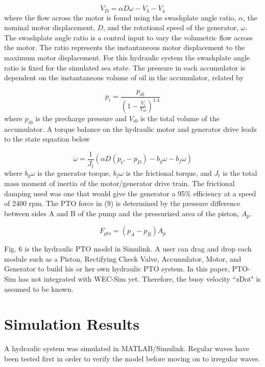 \documentclass[conference]{IEEEtran}
\begin{document}
\begin{equation}
\dot{V}_D=\alpha D \omega-\dot{V}_3-\dot{V}_4 
\end{equation}
%
where the flow across the motor is found using the swashplate angle ratio, $\alpha$, the nominal motor displacement, $D$, and the rotational speed of the generator, $\omega$. The swashplate angle ratio is a control input to vary the volumetric flow across the motor. The ratio represents the instantaneous motor displacement to the maximum motor displacement. For this hydraulic system the swashplate angle ratio is fixed for the simulated sea state. The pressure in each accumulator is dependent on the instantaneous volume of oil in the accumulator, related by

\begin{equation}
p_i=\frac{p_{i0}}{(1-\frac{V_i}{V_{i0}})^{1.4}}
\end{equation}
%
where $p_{i0}$ is the precharge pressure and $V_{i0}$ is the total volume of the accumulator. A torque balance on the hydraulic motor and generator drive leads to the state equation below

\begin{equation}
\dot{\omega}=\frac{1}{J_t}(\alpha D (p_C-p_D)-b_g \omega-b_f \omega)
\end{equation}
%
where $b_g$$\omega$ is the generator torque, $b_f$$\omega$ is the frictional torque, and $J_t$ is the total mass moment of inertia of the motor/generator drive train.  The frictional damping used was one that would give the generator a 95\% efficiency at a speed of 2400 rpm. 
The PTO force in (9) is determined by the pressure difference between sides A and B of the pump and the pressurized area of the piston, $A_p$.

\begin{equation}
F_{pto}=(p_A-p_B)A_p
\end{equation}

Fig. 6 is the hydraulic PTO model in Simulink. A user can drag and drop each module such as a Piston, Rectifying Check Valve, Accumulator, Motor, and Generator to build his or her own hydraulic PTO system. In this paper, PTO-Sim has not integrated with WEC-Sim yet. Therefore, the buoy velocity ``zDot" is assumed to be known.

\section{Simulation Results}
A hydraulic system was simulated in MATLAB/Simulink. Regular waves have been tested first in order to verify the model before moving on to irregular waves. 
\end{document}
